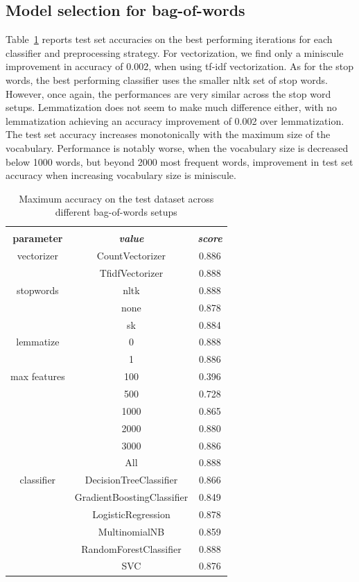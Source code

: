 \documentclass[conference]{IEEEtran}
\begin{document}
\subsection{Model selection for bag-of-words}

Table~\ref{tab5} reports test set accuracies on the best performing iterations for each classifier and preprocessing strategy. For vectorization, we find only a miniscule improvement in accuracy of 0.002, when using tf-idf vectorization. As for the stop words, the best performing classifier uses the smaller nltk set of stop words. However, once again, the  performances are very similar across the stop word setups. Lemmatization does not seem to make much difference either, with no lemmatization achieving an accuracy improvement of 0.002 over lemmatization. The test set accuracy increases monotonically with the maximum size of the vocabulary. Performance is notably worse, when the vocabulary size is decreased below 1000 words, but beyond 2000 most frequent words, improvement in test set accuracy when increasing vocabulary size is miniscule.

\begin{table}[htbp]
\caption{Maximum accuracy on the test dataset across different bag-of-words setups}
\begin{center}
\begin{tabular}{|c|c|c|}
\hline
\textbf{}&\multicolumn{2}{|c|}{\textbf{}} \\ 
\cline{2-3}
\textbf{parameter} & \textbf{\textit{value}}& \textbf{\textit{score}} \\ 
\hline
vectorizer & CountVectorizer & 0.886 \\ 
\cline{2-3}
 & TfidfVectorizer & 0.888 \\ 
\hline
stopwords & nltk & 0.888 \\ 
\cline{2-3}
 & none & 0.878 \\ 
\cline{2-3}
 & sk & 0.884 \\ 
\hline
lemmatize & 0 & 0.888 \\ 
\cline{2-3}
 & 1 & 0.886 \\ 
\hline
max features  & 100 & 0.396 \\ 
\cline{2-3}
  & 500 & 0.728 \\ 
\cline{2-3}
 & 1000 & 0.865 \\ 
\cline{2-3}
  & 2000 & 0.880 \\ 
\cline{2-3}
  & 3000 & 0.886 \\ 
\cline{2-3}
 & All & 0.888 \\ 
\hline
classifier & DecisionTreeClassifier & 0.866 \\ 
\cline{2-3}
 & GradientBoostingClassifier & 0.849 \\ 
\cline{2-3}
 & LogisticRegression & 0.878 \\ 
\cline{2-3}
 & MultinomialNB & 0.859 \\ 
\cline{2-3}
 & RandomForestClassifier & 0.888 \\ 
\cline{2-3}
 & SVC & 0.876 \\ 
\hline
\end{tabular}
\label{tab5}
\end{center}
\end{table}
\end{document}
